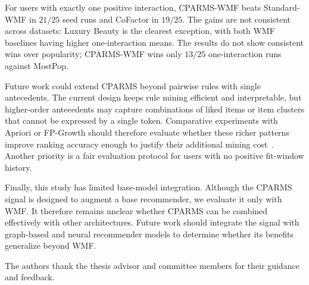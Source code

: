 \documentclass[pdflatex,sn-vancouver-num]{sn-jnl}%
\theoremstyle{thmstyleone}%
\theoremstyle{thmstyletwo}%
\theoremstyle{thmstylethree}%
\begin{document}
For users with exactly one positive interaction, CPARMS-WMF beats Standard-WMF in $21/25$ seed runs and CoFactor in $19/25$. The gains are not consistent across datasets: Luxury Beauty is the clearest exception, with both WMF baselines having higher one-interaction means. The results do not show consistent wins over popularity; CPARMS-WMF wins only $13/25$ one-interaction runs against MostPop.

Future work could extend CPARMS beyond pairwise rules with single antecedents. The current design keeps rule mining efficient and interpretable, but higher-order antecedents may capture combinations of liked items or item clusters that cannot be expressed by a single token. Comparative experiments with Apriori or FP-Growth should therefore evaluate whether these richer patterns improve ranking accuracy enough to justify their additional mining cost~\cite{mythili2013performance}. Another priority is a fair evaluation protocol for users with no positive fit-window history.

Finally, this study has limited base-model integration. Although the CPARMS signal is designed to augment a base recommender, we evaluate it only with WMF. It therefore remains unclear whether CPARMS can be combined effectively with other architectures. Future work should integrate the signal with graph-based and neural recommender models to determine whether its benefits generalize beyond WMF.

\clearpage

\backmatter





The authors thank the thesis advisor and committee members for their guidance and feedback.
\end{document}
